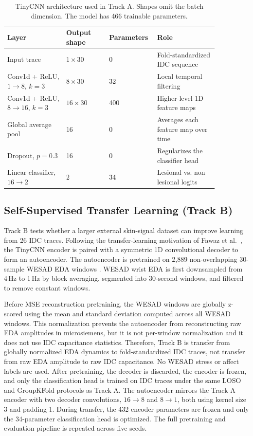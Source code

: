 \documentclass[acmtog]{acmart}
\begin{document}
\begin{table}[t]
  \caption{TinyCNN architecture used in Track A. Shapes omit the batch dimension.
           The model has 466 trainable parameters.}
  \label{tab:tinycnn_arch}
  \centering\scriptsize
  \begin{tabular}{@{}p{0.26\linewidth}p{0.19\linewidth}p{0.14\linewidth}p{0.27\linewidth}@{}}
    \toprule
    Layer & Output shape & Parameters & Role \\
    \midrule
    Input trace & $1\times30$ & 0 & Fold-standardized IDC sequence \\
    Conv1d + ReLU, $1\to8$, $k{=}3$ & $8\times30$ & 32 & Local temporal filtering \\
    Conv1d + ReLU, $8\to16$, $k{=}3$ & $16\times30$ & 400 & Higher-level 1D feature maps \\
    Global average pool & 16 & 0 & Averages each feature map over time \\
    Dropout, $p{=}0.3$ & 16 & 0 & Regularizes the classifier head \\
    Linear classifier, $16\to2$ & 2 & 34 & Lesional vs. non-lesional logits \\
    \bottomrule
  \end{tabular}
\end{table}

\subsection{Self-Supervised Transfer Learning (Track B)}\label{sec:cnn_b}
Track B tests whether a larger external skin-signal dataset can improve learning
from 26 IDC traces. Following the transfer-learning motivation of Fawaz et al.\
\cite{fawaz2018transfer,fawaz2019deep}, the TinyCNN encoder is paired with a
symmetric 1D convolutional decoder to form an autoencoder. The autoencoder is
pretrained on 2,889 non-overlapping 30-sample WESAD EDA windows
\cite{schmidt2018wesad}. WESAD wrist EDA is first downsampled from 4\,Hz to
1\,Hz by block averaging, segmented into 30-second windows, and filtered to
remove constant windows.

Before MSE reconstruction pretraining, the WESAD windows are globally z-scored
using the mean and standard deviation computed across all WESAD windows. This
normalization prevents the autoencoder from reconstructing raw EDA amplitudes in
microsiemens, but it is not per-window normalization and it does not use IDC
capacitance statistics. Therefore, Track B is transfer from globally normalized
EDA dynamics to fold-standardized IDC traces, not transfer from raw EDA amplitude
to raw IDC capacitance. No WESAD stress or affect labels are used. After
pretraining, the decoder is discarded, the encoder is frozen, and only the
classification head is trained on IDC traces under the same LOSO and GroupKFold
protocols as Track A. The autoencoder mirrors the Track A encoder with two decoder
convolutions, $16\to8$ and $8\to1$, both using kernel size 3 and padding 1. During
transfer, the 432 encoder parameters are frozen and only the 34-parameter
classification head is optimized. The full pretraining and evaluation pipeline is
repeated across five seeds.
\end{document}
